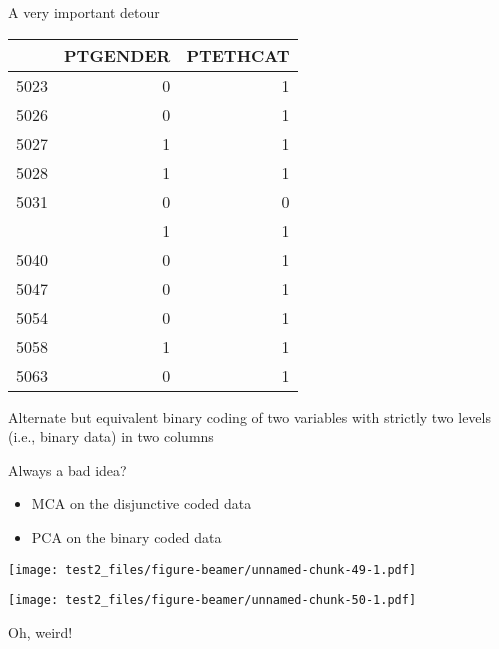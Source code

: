 \documentclass[
  ignorenonframetext,
]{beamer}
\providecommand{\tightlist}{%
  \setlength{\itemsep}{0pt}\setlength{\parskip}{0pt}}
\begin{document}
\begin{frame}{A very important detour}
\protect\hypertarget{a-very-important-detour-4}{}

\begin{table}[H]
\centering\begingroup\fontsize{7}{9}\selectfont

\begin{tabular}{lrr}
\toprule
  & PTGENDER & PTETHCAT\\
\midrule
5023 & 0 & 1\\
5026 & 0 & 1\\
5027 & 1 & 1\\
5028 & 1 & 1\\
5031 & 0 & 0\\
\addlinespace
5037 & 1 & 1\\
5040 & 0 & 1\\
5047 & 0 & 1\\
5054 & 0 & 1\\
5058 & 1 & 1\\
5063 & 0 & 1\\
\bottomrule
\end{tabular}\endgroup{}
\end{table}

\begin{center}Alternate but equivalent binary coding of two variables with strictly two levels (i.e., binary data) in two columns\end{center}

\end{frame}

\begin{frame}{Always a bad idea?}
\protect\hypertarget{always-a-bad-idea}{}

\begin{itemize}[<+->]
\tightlist
\item
  MCA on the disjunctive coded data
\item
  PCA on the binary coded data
\end{itemize}

\end{frame}

\begin{frame}

\texttt{[image: test2\_files/figure-beamer/unnamed-chunk-49-1.pdf]}

\end{frame}

\begin{frame}

\texttt{[image: test2\_files/figure-beamer/unnamed-chunk-50-1.pdf]}

\begin{center}Oh, weird!\end{center}

\end{frame}
\end{document}
